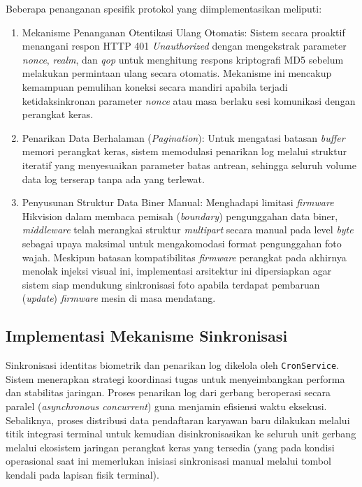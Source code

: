 Beberapa penanganan spesifik protokol yang diimplementasikan meliputi:
\begin{enumerate}
    \item Mekanisme Penanganan Otentikasi Ulang Otomatis: Sistem secara proaktif menangani respon HTTP 401 \textit{Unauthorized} dengan mengekstrak parameter \textit{nonce}, \textit{realm}, dan \textit{qop} untuk menghitung respons kriptografi MD5 sebelum melakukan permintaan ulang secara otomatis. Mekanisme ini mencakup kemampuan pemulihan koneksi secara mandiri apabila terjadi ketidaksinkronan parameter \textit{nonce} atau masa berlaku sesi komunikasi dengan perangkat keras.
    \item Penarikan Data Berhalaman (\textit{Pagination}): Untuk mengatasi batasan \textit{buffer} memori perangkat keras, sistem memodulasi penarikan log melalui struktur iteratif yang menyesuaikan parameter batas antrean, sehingga seluruh volume data log terserap tanpa ada yang terlewat.
    \item Penyusunan Struktur Data Biner Manual: Menghadapi limitasi \textit{firmware} Hikvision dalam membaca pemisah (\textit{boundary}) pengunggahan data biner, \textit{middleware} telah merangkai struktur \textit{multipart} secara manual pada level \textit{byte} sebagai upaya maksimal untuk mengakomodasi format pengunggahan foto wajah. Meskipun batasan kompatibilitas \textit{firmware} perangkat pada akhirnya menolak injeksi visual ini, implementasi arsitektur ini dipersiapkan agar sistem siap mendukung sinkronisasi foto apabila terdapat pembaruan (\textit{update}) \textit{firmware} mesin di masa mendatang.
\end{enumerate}



\subsection{Implementasi Mekanisme Sinkronisasi}
Sinkronisasi identitas biometrik dan penarikan log dikelola oleh \texttt{CronService}. Sistem menerapkan strategi koordinasi tugas untuk menyeimbangkan performa dan stabilitas jaringan. Proses penarikan log dari gerbang beroperasi secara paralel (\textit{asynchronous concurrent}) guna menjamin efisiensi waktu eksekusi. Sebaliknya, proses distribusi data pendaftaran karyawan baru dilakukan melalui titik integrasi terminal untuk kemudian disinkronisasikan ke seluruh unit gerbang melalui ekosistem jaringan perangkat keras yang tersedia (yang pada kondisi operasional saat ini memerlukan inisiasi sinkronisasi manual melalui tombol kendali pada lapisan fisik terminal).


